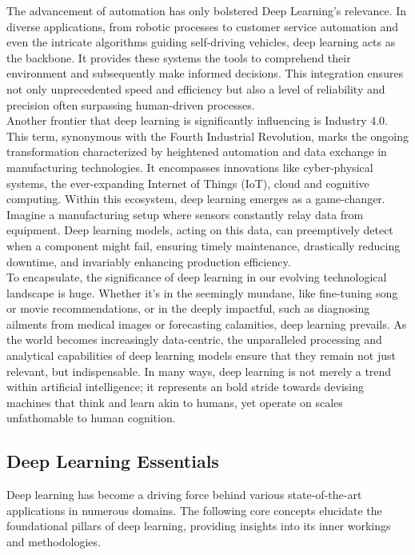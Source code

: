 The advancement of automation has only bolstered Deep Learning's relevance. 
In diverse applications, from robotic processes to customer service automation 
and even the intricate algorithms guiding self-driving vehicles, deep learning 
acts as the backbone. It provides these systems the tools to comprehend their 
environment and subsequently make informed decisions. This integration ensures 
not only unprecedented speed and efficiency but also a level of reliability and 
precision often surpassing human-driven processes.\\

Another frontier that deep learning is significantly influencing is Industry 4.0. 
This term, synonymous with the Fourth Industrial Revolution, marks the ongoing 
transformation characterized by heightened automation and data exchange in manufacturing 
technologies. It encompasses innovations like cyber-physical systems, the ever-expanding 
Internet of Things (IoT), cloud and cognitive computing. Within this ecosystem, deep learning 
emerges as a game-changer. Imagine a manufacturing setup where sensors constantly relay data 
from equipment. Deep learning models, acting on this data, can preemptively detect when a 
component might fail, ensuring timely maintenance, drastically reducing downtime, and 
invariably enhancing production efficiency.\\

To encapsulate, the significance of deep learning in our evolving technological 
landscape is huge. Whether it’s in the seemingly mundane, like fine-tuning song or movie recommendations, or in the deeply impactful, such as diagnosing ailments from medical images or forecasting calamities, deep learning prevails. 
As the world becomes increasingly data-centric, the unparalleled processing and analytical 
capabilities of deep learning models ensure that they remain not just relevant, but 
indispensable. In many ways, deep learning is not merely a trend within artificial 
intelligence; it represents an bold stride towards devising machines that think and 
learn akin to humans, yet operate on scales unfathomable to human cognition.\\

\subsection{Deep Learning Essentials}

Deep learning has become a driving force behind various state-of-the-art applications in numerous domains. The following core concepts elucidate the foundational pillars of deep learning, providing insights into its inner workings and methodologies.

